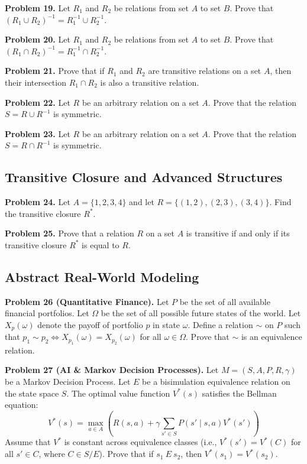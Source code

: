 \documentclass[11pt, a4paper]{article}
\theoremstyle{definition}
\theoremstyle{remark}
\begin{document}
\vspace{0.5em}
\noindent
\textbf{Problem 19.} Let $R_1$ and $R_2$ be relations from set $A$ to set $B$. Prove that $(R_1 \cup R_2)^{-1} = R_1^{-1} \cup R_2^{-1}$.

\vspace{0.5em}
\noindent
\textbf{Problem 20.} Let $R_1$ and $R_2$ be relations from set $A$ to set $B$. Prove that $(R_1 \cap R_2)^{-1} = R_1^{-1} \cap R_2^{-1}$.

\vspace{0.5em}
\noindent
\textbf{Problem 21.} Prove that if $R_1$ and $R_2$ are transitive relations on a set $A$, then their intersection $R_1 \cap R_2$ is also a transitive relation.

\vspace{0.5em}
\noindent
\textbf{Problem 22.} Let $R$ be an arbitrary relation on a set $A$. Prove that the relation $S = R \cup R^{-1}$ is symmetric.

\vspace{0.5em}
\noindent
\textbf{Problem 23.} Let $R$ be an arbitrary relation on a set $A$. Prove that the relation $S = R \cap R^{-1}$ is symmetric.

\subsection{Transitive Closure and Advanced Structures}
\textbf{Problem 24.} Let $A = \{1, 2, 3, 4\}$ and let $R = \{(1, 2), (2, 3), (3, 4)\}$. Find the transitive closure $R^*$.

\vspace{0.5em}
\noindent
\textbf{Problem 25.} Prove that a relation $R$ on a set $A$ is transitive if and only if its transitive closure $R^*$ is equal to $R$.

\subsection{Abstract Real-World Modeling}
\textbf{Problem 26 (Quantitative Finance).} Let $P$ be the set of all available financial portfolios. Let $\Omega$ be the set of all possible future states of the world. Let $X_p(\omega)$ denote the payoff of portfolio $p$ in state $\omega$. Define a relation $\sim$ on $P$ such that $p_1 \sim p_2 \iff X_{p_1}(\omega) = X_{p_2}(\omega)$ for all $\omega \in \Omega$. Prove that $\sim$ is an equivalence relation.

\vspace{0.5em}
\noindent
\textbf{Problem 27 (AI \& Markov Decision Processes).} Let $M = (S, A, P, R, \gamma)$ be a Markov Decision Process. Let $E$ be a bisimulation equivalence relation on the state space $S$. The optimal value function $V^*(s)$ satisfies the Bellman equation:
\[ V^*(s) = \max_{a \in A} \left( R(s,a) + \gamma \sum_{s' \in S} P(s' \mid s,a) V^*(s') \right) \]
Assume that $V^*$ is constant across equivalence classes (i.e., $V^*(s') = V^*(C)$ for all $s' \in C$, where $C \in S/E$). Prove that if $s_1 \ E \ s_2$, then $V^*(s_1) = V^*(s_2)$.
\end{document}
